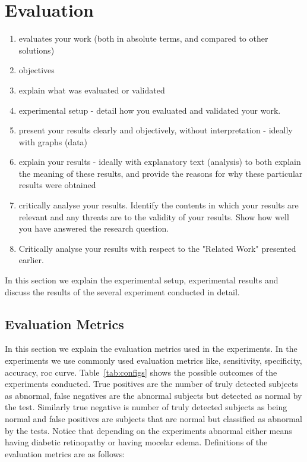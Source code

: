 \chapter{Evaluation}

\begin{enumerate}
    \item evaluates your work (both in absolute terms, and compared to other solutions)
    \item objectives
    \item explain what was evaluated or validated
    \item experimental setup - detail how you evaluated and validated your work.
    \item present your results clearly and objectively, without interpretation - ideally with graphs (data)
    \item explain your results - ideally with explanatory text (analysis) to both explain the meaning of these results, and provide the reasons for why these particular results were obtained
    \item critically analyse your results. Identify the contents in which your results are relevant and any threats are to the validity of your results. Show how well you have answered the research question.
    \item Critically analyse your results with respect to the "Related Work" presented earlier.
\end{enumerate}

In this section we explain the experimental setup, experimental results and discuss the results of the several experiment conducted in detail. 

\section{Evaluation Metrics}
In this section we explain the evaluation metrics used in the experiments. In the experiments we use commonly used evaluation metrics like, sensitivity, specificity, accuracy, roc curve. Table~\ref{tab:configs} shows the possible outcomes of the experiments conducted. True positives are the number of truly detected subjects as abnormal, false negatives are the abnormal subjects but detected as normal by the test. Similarly true negative is number of truly detected subjects as being normal and false positives are subjects that are normal but classified as abnormal by the tests. Notice that depending on the experiments abnormal either means having diabetic retinopathy or having mocelar edema. Definitions of the evaluation metrics are as follows: 

